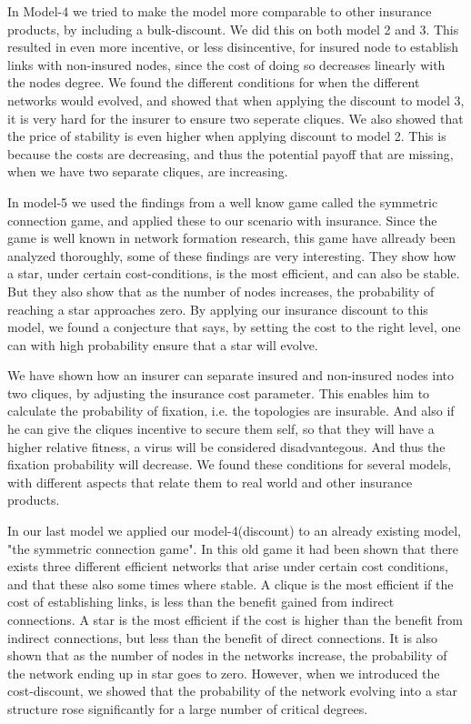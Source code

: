 In Model-4 we tried to make the model more comparable to other insurance products, by including a bulk-discount. We did this on both model 2 and 3. This resulted in even more incentive, or less disincentive, for insured node to establish links with non-insured nodes, since the cost of doing so decreases linearly with the nodes degree. 
We found the different conditions for when the different networks would evolved, and showed that when applying the discount to model 3, it is very hard for the insurer to ensure two seperate cliques. 
We also showed that the price of stability is even higher when applying discount to model 2. This is because the costs are decreasing, and thus the potential payoff that are missing, when we have two separate cliques, are increasing. 


In model-5 we used the findings from a well know game called the symmetric connection game, and applied these to our scenario with insurance. Since the game is well known in network formation research, this game have allready been analyzed thoroughly, some of these findings are very interesting. They show how a star, under certain cost-conditions, is the most efficient, and can also be stable. But they also show that as the number of nodes increases, the probability of reaching a star approaches zero.
By applying our insurance discount to this model, we found a conjecture that says, by setting the cost to the right level, one can with high probability ensure that a star will evolve.

We have shown how an insurer can separate insured and non-insured nodes into two cliques, by adjusting the insurance cost parameter. This enables him to calculate the probability of fixation, i.e. the topologies are insurable. And also if he can give the cliques incentive to secure them self, so that they will have a higher relative fitness, a virus will be considered disadvantegous. And thus the fixation probability will decrease. 
We found these conditions for several models, with different aspects that relate them to real world and other insurance products.

In our last model we applied our model-4(discount) to an already existing model, "the symmetric connection game". In this old game it had been shown that there exists three different efficient networks that arise under certain cost conditions, and that these also some times where stable. A clique is the most efficient if the cost of establishing links, is less than the benefit gained from indirect connections. A star is the most efficient if the cost is higher than the benefit from indirect connections, but less than the benefit of direct connections. 
It is also shown that as the number of nodes in the networks increase, the probability of the network ending up in star goes to zero. However, when we introduced the cost-discount, we showed that the probability of the network evolving into a star structure rose significantly for a large number of critical degrees. 



